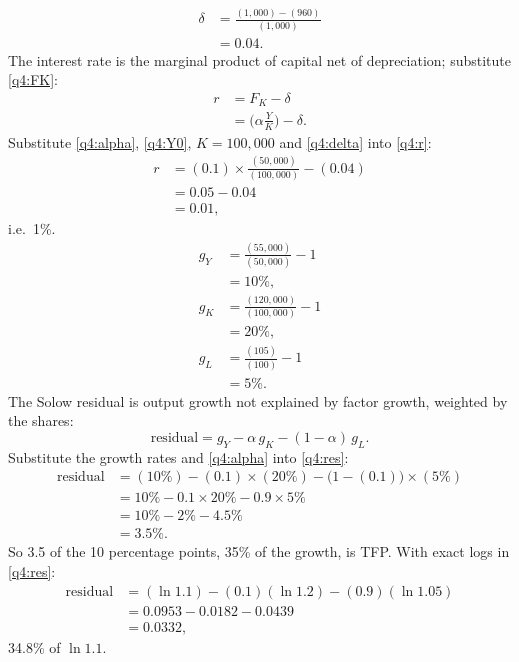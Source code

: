 \begin{sol}
\begin{align}
\delta &= \frac{(1{,}000)-(960)}{(1{,}000)} \nonumber\\
&= 0.04. \label{q4:delta}
\end{align}
The interest rate is the marginal product of capital net of depreciation; substitute \eqref{q4:FK}:
\begin{align}
r &= F_K-\delta \nonumber\\
&= \Big(\alpha\frac YK\Big)-\delta. \label{q4:r}
\end{align}
Substitute \eqref{q4:alpha}, \eqref{q4:Y0}, $K=100{,}000$ and \eqref{q4:delta} into \eqref{q4:r}:
\begin{align*}
r &= (0.1)\times\frac{(50{,}000)}{(100{,}000)}-(0.04)\\
&= 0.05-0.04\\
&= 0.01,
\end{align*}
i.e.\ 1\%.
\begin{align*}
g_Y &= \frac{(55{,}000)}{(50{,}000)}-1\\
&= 10\%,\\
g_K &= \frac{(120{,}000)}{(100{,}000)}-1\\
&= 20\%,\\
g_L &= \frac{(105)}{(100)}-1\\
&= 5\%.
\end{align*}
The Solow residual is output growth not explained by factor growth, weighted by the shares:
\begin{equation}
\text{residual}=g_Y-\alpha\,g_K-(1-\alpha)\,g_L. \label{q4:res}
\end{equation}
Substitute the growth rates and \eqref{q4:alpha} into \eqref{q4:res}:
\begin{align*}
\text{residual} &= (10\%)-(0.1)\times(20\%)-\big(1-(0.1)\big)\times(5\%)\\
&= 10\%-0.1\times20\%-0.9\times5\%\\
&= 10\%-2\%-4.5\%\\
&= 3.5\%.
\end{align*}
So 3.5 of the 10 percentage points, 35\% of the growth, is TFP. With exact logs in \eqref{q4:res}:
\begin{align*}
\text{residual} &= (\ln1.1)-(0.1)(\ln1.2)-(0.9)(\ln1.05)\\
&= 0.0953-0.0182-0.0439\\
&= 0.0332,
\end{align*}
34.8\% of $\ln1.1$.
\end{sol}
